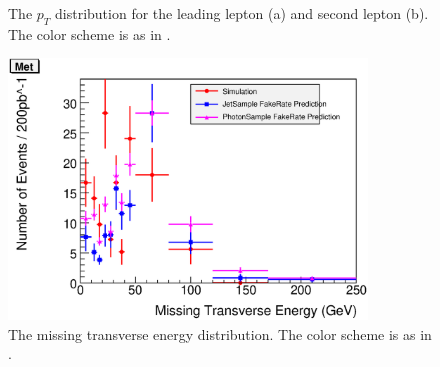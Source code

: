 \documentclass{cmspaper}
\begin{document}
\begin{figure}[htb]
\begin{center}
   \caption{The $p_T$ distribution for the leading lepton (a) and second lepton (b). The color  scheme is as in .}
   \label{fig:leptonPt}
\end{center}
\end{figure}

\begin{figure}[htb]
\begin{center}
\includegraphics[width=0.85\textwidth]{plots/Met.eps}
   \caption{The missing transverse energy distribution. The color  scheme is as in .}
   \label{fig:Met}
\end{center}
\end{figure}
\end{document}
